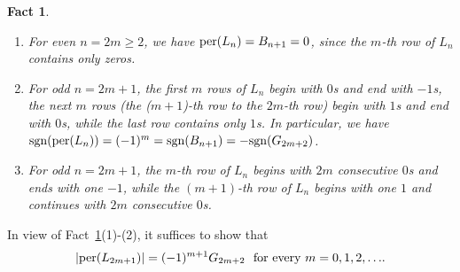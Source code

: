 \documentclass[11pt,reqno]{amsart}
\numberwithin{equation}{section}
\theoremstyle{plain}
\newtheorem{Fact}[theorem]{Fact}
\theoremstyle{definition}
\def\per{\mathrm{per}}
\def\sgn{\mathrm{sgn}}
\def\per{{\rm per}}
\begin{document}
\begin{Fact}\label{fact}
\begin{enumerate}[{\rm (1)}]
\item For even $n=2m\ge 2$, we have $\per(L_n)=B_{n+1}=0$, since the $m$-th row of $L_n$ contains only zeros.
\item For odd $n=2m+1$, the first $m$ rows of $L_n$ begin with $0$s and end with $-1$s, the next $m$ rows (the ($m+1$)-th row to the $2m$-th row) begin with $1$s and end with $0$s, while the last row contains only $1$s. In particular, we have $\sgn(\per(L_n))=(-1)^m=\sgn(B_{n+1})=-\sgn(G_{2m+2})$.
\item For odd $n=2m+1$, the $m$-th row of $L_n$ begins with $2m$ consecutive $0$s and ends with one $-1$, while the $(m+1)$-th row of $L_n$ begins with one $1$ and continues with $2m$ consecutive $0$s.
\end{enumerate}
\end{Fact}

In view of Fact~\ref{fact}(1)-(2), it suffices to show that
\begin{align}
\label{id:per=G}
|\per(L_{2m+1})|=(-1)^{m+1}G_{2m+2}\  \text{ for every $m=0,1,2,\ldots$.}
\end{align}
\end{document}
